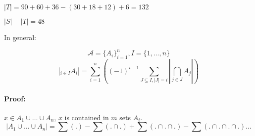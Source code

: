 \documentclass[11pt]{article}
\begin{document}
$ | T | = 90 + 60 + 36 - (30 + 18 + 12) + 6 = 132 $ \newline

$ | S | - | T | = 48 $ \newline

In general: \newline

\[ \mathcal{A} = \{ A_i \}^n_{i=1}, I = \{1, \dots, n\} \]
\[ |_{i \in I} A_i | = \sum \limits_{i=1}^n \left( ( -1)^{i - 1} \sum \limits_{J \subseteq I, |J| = i} | \bigcap \limits_{j \in J} A_j | \right) \]

\paragraph{Proof:}

$ x \in A _1 \cup \dots \cup A_n $, $ x $ is contained in $ m $ sets $ A_i $.
\[ | A_1 \cup \dots \cup A_n | = \sum (.) - \sum (. \cap .) + \sum (. \cap . \cap .) - \sum (. \cap . \cap . \cap .) \dots \]
\end{document}
